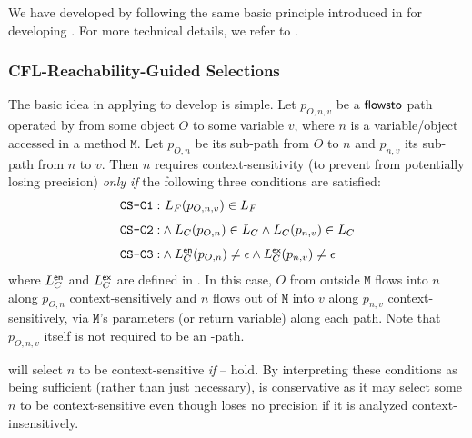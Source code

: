 We have developed \tool by following the same basic principle introduced in 
\cite{lu2021selective} for developing \selectx. For more technical details,
we refer to \cite{lu2021selective}.

\subsubsection{CFL-Reachability-Guided Selections}
\label{subsec:condition}

The basic idea in applying \manuLFC to develop \selectx \cite{lu2021selective} is simple.
Let $p_{O, n, v}$ be a $\textsf{flowsto}$ path   operated by \manuLFC
from some object $O$ to some variable $v$, where $n$ is a variable/object accessed in
a method $\mathtt{M}$. Let
 $p_{O, n}$ be its sub-path from $O$ to $n$ and $p_{n, v}$ its sub-path from
 $n$ to $v$. 
  Then   $n$ requires  context-sensitivity (to prevent  from
  potentially losing
  precision)
  \textit{only if} the following three conditions are satisfied:
\begin{equation}
\label{eqn:cflcscondition}
\begin{split}
  \text{\selconOne}:  & ~L_{F} (p_{O, n, v}) \in L_{F} \\[1ex]
  \text{\selconTwo}:                      & \wedge L_C(p_{O, n}) \in L_C \wedge L_C(p_{n, v}) \in L_C \\[1ex]  
  \text{\selconThree}:                        &  \wedge L_C^{\entry}(p_{O, n}) \neq  \epsilon \wedge L_C^{\exit}(p_{n, v}) \neq \epsilon
\end{split}
\end{equation}
where $ L_C^{\textsf{en}}$ and  $L_C^{\textsf{ex}}$ are defined in .
In this case, 
 $O$ from outside $\mathtt{M}$ flows into $n$  
   along $p_{O,n}$ context-sensitively
  and  $n$  flows out of  $\mathtt{M}$ into $v$
along $p_{n,v}$   context-sensitively, via $\mathtt{M}$'s
 parameters
(or return variable) along each path. 
Note that $p_{O, n, v}$ itself is not required to be an \manuLFC-path. 


\selectx will select  $n$ to be
context-sensitive \textit{if} \selconOne -- \selconThree hold. By interpreting these conditions as
being sufficient (rather than just necessary), \selectx is conservative as it may
select some $n$ to be context-sensitive even though  loses no precision
if it is analyzed context-insensitively.



